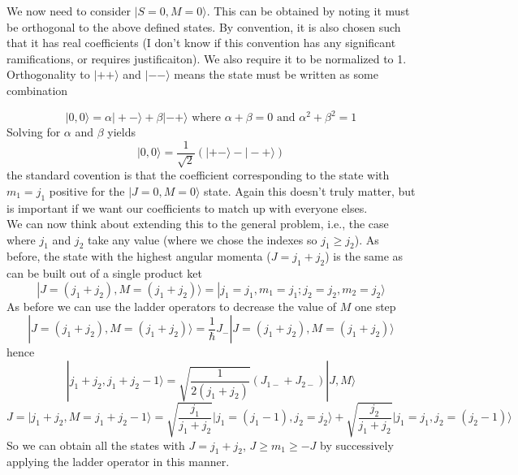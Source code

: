 \documentclass[12pt]{article}
\begin{document}
\noindent We now need to consider $|S=0, M=0\rangle$. This can be obtained by
noting it must be orthogonal to the above defined states. By convention, it is
also chosen such that it has real coefficients (I don't know if this convention
has any significant ramifications, or requires justificaiton).  We also require
it to be normalized to 1. Orthogonality to $|++\rangle$ and $|--\rangle$ means
the state must be written as some combination

\begin{equation}
|0,0\rangle = \alpha | +-\rangle +\beta| -+\rangle
 \text{\ \ \ where \ \ } \alpha+\beta =0
 \text{ \ \ \ and \ \ \ } \alpha^{2}+\beta^{2} = 1
\end{equation}
Solving for $\alpha$ and $\beta$ yields
\begin{equation}
|0,0\rangle = \frac{1}{\sqrt{2}} (|+-\rangle - | -+\rangle )
\end{equation}
the standard covention is that the coefficient corresponding to the state with
$m_{1} = j_{1}$ positive for the $|J=0, M=0\rangle$ state. Again this doesn't
truly matter, but is important if we want our coefficients to match up with
everyone elses.\\

\noindent We can now think about extending this to the general problem, i.e.,
the case where $j_{1}$ and $j_{2}$ take any value (where we chose the indexes
so $j_{1} \geq j_{2}$).  As before, the state with the highest angular momenta
($J=j_{1}+j_{2}$) is the same as can be built out of a single product ket 
\begin{equation}
|J= (j_{1}+j_{2}), M=(j_{1}+j_{2})\rangle = | j_{1} =j_{1}, m_{1}=j_{1}; j_{2}=j_{2},m_{2}=j_{2} \rangle 
\end{equation}
\noindent  As before we can use the ladder operators to decrease the value of $M$ one step
\begin{equation}
|J= (j_{1}+j_{2}), M=(j_{1}+j_{2})\rangle =
\frac{1}{\hbar}J_{-}|J= (j_{1}+j_{2}), M=(j_{1}+j_{2})\rangle 
\end{equation}
\noindent hence
\begin{equation*}
| j_{1}+j_{2}, j_{1}+j_{2}-1\rangle
=\sqrt{\frac{1}{2(j_{1}+j_{2})}}(J_{1-}+J_{2-})|J,M\rangle
\end{equation*}
\begin{equation*}
J=| j_{1}+j_{2},M= j_{1}+j_{2}-1\rangle
=\sqrt{\frac{j_{1}}{j_{1}+j_{2}}}  \Bigg|j_{1}= (j_{1}-1) ,j_{2}=j_{2}\Bigg\rangle+
 \sqrt{\frac{j_{2}}{j_{1}+j_{2}}}  \Bigg|j_{1}= j_{1}   ,j_{2}=(j_{2}-1)\Bigg\rangle
\end{equation*}
So we can obtain all the states with $J=j_{1}+j_{2}$, $J \geq  m_{1} \geq -J $
by successively applying the ladder operator in this manner.\\
\end{document}
